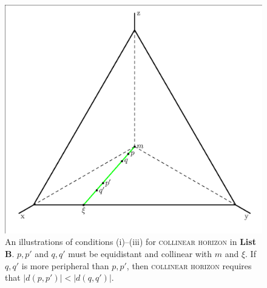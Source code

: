 \documentclass[12pt]{article}
\begin{document}
\begin{figure}[ht]
  \begin{flushright}
    \begin{minipage}[h]{.7\linewidth}
      \includegraphics[width=\textwidth]{horeff.eps}
      \caption{\footnotesize An illustrations of conditions (i)--(iii)
        for \textsc{collinear horizon} in \textbf{List B}. $p,p'$ and $q,q'$
        must be equidistant and collinear with $m$ and $\xi$. If
        $q,q'$ is more peripheral than $p,p'$, then \textsc{collinear
          horizon} requires that $|d(p,p')|<|d(q,q')|$.}
      \label{fig:conditions}
    \end{minipage}
  \end{flushright}
\end{figure}
\end{document}

